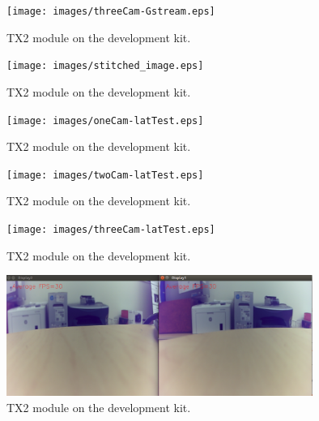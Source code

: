 \documentclass[letterpaper,10pt,serif,draftclsnofoot,onecolumn,compsoc,titlepage]{IEEEtran}
\begin{document}
\begin{figure}[H]
	\centering
	\label{fig:Video output of three cameras using GStreamer.}
	\texttt{[image: images/threeCam-Gstream.eps]}
	\caption{TX2 module on the development kit. \label{overflow}}
\end{figure}

\begin{figure}[H]
	\centering
	\label{fig:Video output of our stitching program using OpenCV.}
	\texttt{[image: images/stitched\_image.eps]}
	\caption{TX2 module on the development kit. \label{overflow}}
\end{figure}

\begin{figure}[H]
	\centering
	\label{fig:The result of our one-camera latency test.}
	\texttt{[image: images/oneCam-latTest.eps]}
	\caption{TX2 module on the development kit. \label{overflow}}
\end{figure}

\begin{figure}[H]
	\centering
	\label{fig:The result of our two-camera latency test.}
	\texttt{[image: images/twoCam-latTest.eps]}
	\caption{TX2 module on the development kit. \label{overflow}}
\end{figure}

\begin{figure}[H]
	\centering
	\label{fig:The result of our three-camera latency test.}
	\texttt{[image: images/threeCam-latTest.eps]}
	\caption{TX2 module on the development kit. \label{overflow}}
\end{figure}

\begin{figure}[H]
	\centering
	\label{fig:The result of our frame per second test.}
	\includegraphics[width=10cm]{images/fps2.eps}
	\caption{TX2 module on the development kit. \label{overflow}}
\end{figure}

%
%
\end{document}
